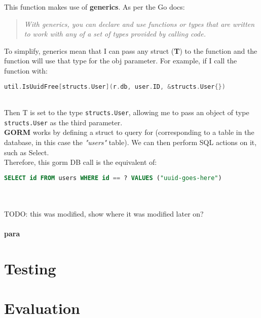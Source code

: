\documentclass{article}
\begin{document}
\noindent This function makes use of \textbf{generics}. As per the Go docs:

\begin{quotation}
    \textit{
        With generics, you can declare and use functions or types that are written to work with any of a set of types provided by calling code.
    }
\end{quotation}

\noindent To simplify, generics mean that I can pass any struct (\textbf{T}) to the function and the function will use that type for the obj parameter.
For example, if I call the function with:\\

\begin{lstlisting}[language=Go]
    util.IsUuidFree[structs.User](r.db, user.ID, &structs.User{})
\end{lstlisting}

\noindent \\Then T is set to the type \lstinline{structs.User}, allowing me to pass an object of type \lstinline{structs.User} as the third parameter.\\

\noindent \textbf{GORM} works by defining a struct to query for (corresponding to a table in the database, in this case the \textit{"users"} table). We can then perform SQL actions on it, such as Select. \\

\noindent Therefore, this gorm DB call is the equivalent of:\\

\begin{lstlisting}[language=SQL]
    SELECT id FROM users WHERE id == ? VALUES ("uuid-goes-here")
\end{lstlisting}

\noindent \\\\ TODO: this was modified, show where it was modified later on?


\paragraph{para}

\section{Testing}

\section{Evaluation}
\end{document}
